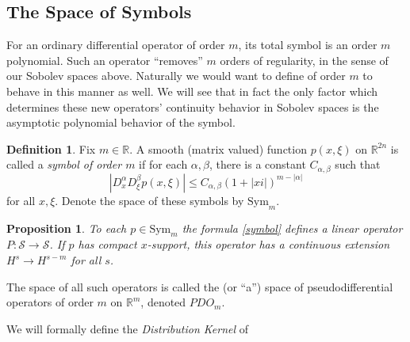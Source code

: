 \documentclass[14pt, reqno]{extarticle}
\theoremstyle{plain}
\newtheorem{proposition}{Proposition}[section]
\theoremstyle{definition}
\newtheorem{definition}{Definition}[section]
\theoremstyle{remark}
\newcommand{\RR}{\mathbb{R}}
\begin{document}
\subsection{The Space of Symbols}

For an ordinary differential operator of order $m$, its total symbol is an order $m$ polynomial. 
Such an operator ``removes'' $m$ orders of regularity, in the sense of our Sobolev spaces above.
Naturally we would want to define of order $m$ to behave in this manner 
as well. We will see that in fact the only factor which determines these new operators' continuity
behavior in Sobolev spaces is the asymptotic polynomial behavior of the symbol. 

\begin{definition}
    Fix $m \in \RR$. A smooth (matrix valued) function $p(x,\xi)$ on $\RR^{2n}$ is called
    a \textit{symbol of order $m$} if for each $\alpha, \beta$, there is a constant $C_{\alpha,\beta}$
    such that
    \[
        |D_x^\alpha D_\xi^\beta p(x,\xi)|\leq C_{\alpha,\beta}(1 + |xi|)^{m-|\alpha|}
    \]
    for all $x, \xi$. Denote the space of these symbols by $\text{Sym}_m$.
\end{definition}

\begin{proposition}
    To each $p \in \text{Sym}_m$ the formula \ref{symbol} defines a linear operator $P: \mathscr{S}
    \to \mathscr{S}$. If $p$ has compact $x$-support, this operator has a continuous
    extension $H^s \to H^{s-m}$ for all $s$.
\end{proposition}

The space of all such operators is called the (or ``a'') space of pseudodifferential operators 
of order $m$ on $\RR^m$, denoted $PDO_m$.
 
We will formally define the \textit{Distribution Kernel} of 

{}

\end{document}
